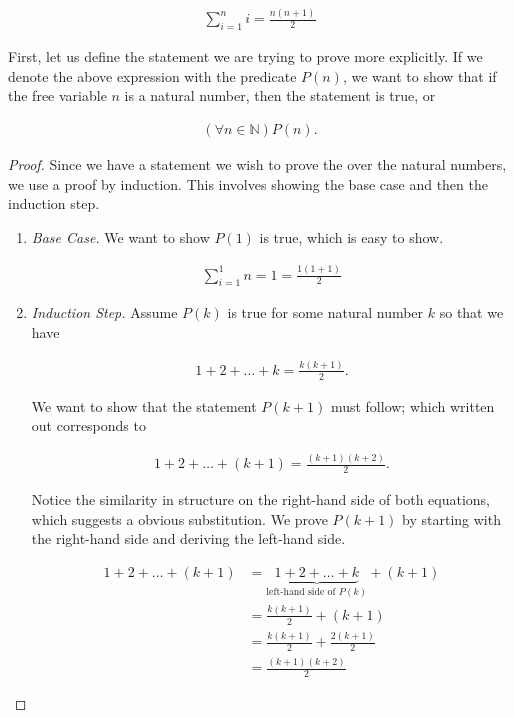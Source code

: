 \documentclass[twoside]{report}
\begin{document}
\begin{align*}
	\sum_{i = 1}^{n} i = \frac{n(n + 1)}{2}
\end{align*}

First, let us define the statement we are trying to prove more explicitly. If we denote the above expression with the predicate $P(n)$, we want to show that if the free variable $n$ is a natural number, then the statement is true, or

\begin{align*}
	(\forall n \in \mathbb{N})P(n).
\end{align*}

\vspace{\baselineskip}
\begin{proof}
	Since we have a statement we wish to prove the over the natural numbers, we use a proof by induction. This involves showing the base case and then the induction step.
	
	\vspace{\baselineskip}
	\begin{enumerate}
		\item \emph{Base Case.} We want to show $P(1)$ is true, which is easy to show.
		
		\begin{align*}
			\sum_{i = 1}^1 n = 1 = \frac{1 (1 + 1)}{2}
		\end{align*}
		
		
		\item \emph{Induction Step.} Assume $P(k)$ is true for some natural number $k$ so that we have
		
		\begin{align*}
			1 + 2 + \dots + k = \frac{k(k + 1)}{2}.
		\end{align*}
		
		We want to show that the statement $P(k + 1)$ must follow; which written out corresponds to
		
		\begin{align*}
			1 + 2 + \dots + (k + 1) = \frac{(k + 1)(k + 2)}{2}.
		\end{align*}
		
		Notice the similarity in structure on the right-hand side of both equations, which suggests a obvious substitution. We prove $P(k + 1)$ by starting with the right-hand side and deriving the left-hand side.
		
		\begin{align*}
			1 + 2 + \dots + (k + 1) &= \underbrace{1 + 2 + \dots + k}_\text{left-hand side of $P(k)$} + (k + 1) \\
			&= \frac{k (k + 1)}{2} + (k + 1) \\
			&= \frac{k (k + 1)}{2} + \frac{2 (k + 1)}{2} \\
			&= \frac{(k + 1)(k + 2)}{2}
		\end{align*}
		

\end{enumerate}
\end{proof}
\end{document}
